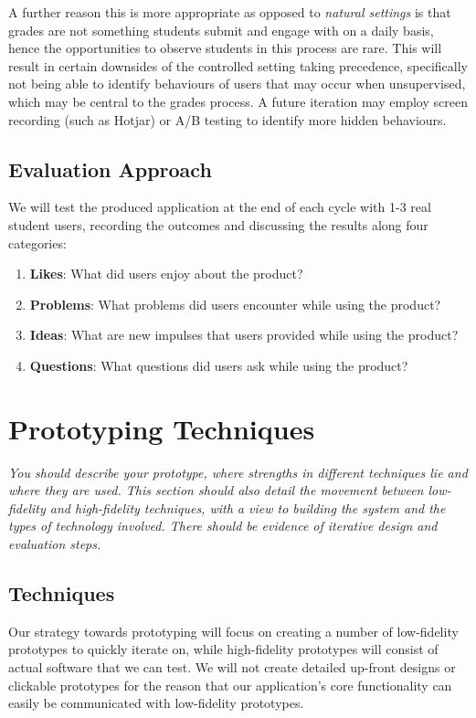 A further reason this is more appropriate as opposed to \textit{natural settings} is that grades are not something students submit and engage with on a daily basis, hence the opportunities to observe students in this process are rare. This will result in certain downsides of the controlled setting taking precedence, specifically not being able to identify behaviours of users that may occur when unsupervised, which may be central to the grades process. A future iteration may employ screen recording (such as Hotjar) or A/B testing to identify more hidden behaviours.

\subsection{Evaluation Approach}

We will test the produced application at the end of each cycle with 1-3 real student users, recording the outcomes and discussing the results along four categories:

\begin{enumerate}
    \item \textbf{Likes}: What did users enjoy about the product?
        \item \textbf{Problems}: What problems did users encounter while using the product?
            \item \textbf{Ideas}: What are new impulses that users provided while using the product?
                \item \textbf{Questions}: What questions did users ask while using the product?
\end{enumerate}

\section{Prototyping Techniques}
\textit{You should describe your prototype, where strengths in different techniques lie and where they are used. This section should also detail the movement between low- fidelity and high-fidelity techniques, with a view to building the system and the types of technology involved. There should be evidence of iterative design and evaluation steps.}
\subsection{Techniques}
Our strategy towards prototyping will focus on creating a number of low-fidelity prototypes to quickly iterate on, while high-fidelity prototypes will consist of actual software that we can test. We will not create detailed up-front designs or clickable prototypes for the reason that our application's core functionality can easily be communicated with low-fidelity prototypes.

